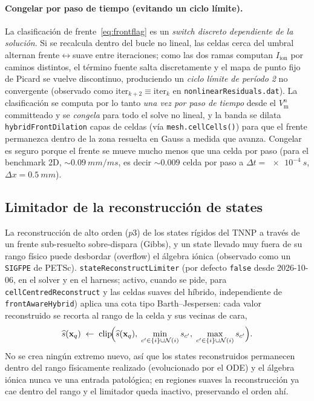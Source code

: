 \documentclass[11pt,a4paper]{article}
\newcommand{\code}[1]{\texttt{\small #1}}
\newcommand{\Vm}{V_{\text{m}}}
\newcommand{\Iion}{I_{\mathrm{ion}}}
\newcommand{\dictkey}[1]{\textcolor{black!60!green}{\texttt{\footnotesize #1}}}
\begin{document}
\paragraph{Congelar por paso de tiempo (evitando un ciclo límite).}
La clasificación de frente~\eqref{eq:frontflag} es un \emph{switch discreto
dependiente de la solución}. Si se recalcula dentro del bucle no lineal, las celdas
cerca del umbral alternan frente$\leftrightarrow$suave entre iteraciones; como las
dos ramas computan $\Iion$ por caminos distintos, el término fuente salta
discretamente y el mapa de punto fijo de Picard se vuelve discontinuo, produciendo
un \emph{ciclo límite de período 2} no convergente (observado como
$\text{iter}_{k+2}\equiv\text{iter}_k$ en \code{nonlinearResiduals.dat}). La
clasificación se computa por lo tanto \emph{una vez por paso de tiempo} desde el
$\Vm^{n}$ committeado y se \emph{congela} para todo el solve no lineal, y la banda
se dilata \dictkey{hybridFrontDilation} capas de celdas (vía
\code{mesh.cellCells()}) para que el frente permanezca dentro de la zona resuelta
en Gauss a medida que avanza. Congelar es seguro porque el frente se mueve mucho
menos que una celda por paso (para el benchmark 2D, $\sim\!\SI{0.09}{mm/ms}$, es
decir $\sim\!0.009$ celda por paso a $\Delta t=\SI{e-4}{s}$, $\Delta x=\SI{0.5}{mm}$).

\subsection{Limitador de la reconstrucción de states}
\label{sec:limiter}

La reconstrucción de alto orden ($p3$) de los states rígidos del TNNP a través de
un frente sub-resuelto sobre-dispara (Gibbs), y un state llevado muy fuera de su
rango físico puede desbordar (overflow) el álgebra iónica (observado como un
\code{SIGFPE} de PETSc). \dictkey{stateReconstructLimiter} (por defecto
\code{false} desde 2026-10-06, en el solver y en el harness; activo, cuando se
pide, para \code{cellCentredReconstruct} y las celdas suaves del híbrido,
independiente de \dictkey{frontAwareHybrid}) aplica una cota tipo
Barth--Jespersen: cada valor reconstruido se recorta al rango de la celda y sus
vecinas de cara,
\begin{equation}
  \widehat{s}(\mathbf{x}_q)
  \;\leftarrow\;
  \mathrm{clip}\!\Bigl(\widehat{s}(\mathbf{x}_q),\;
     \min_{c'\in\{i\}\cup\mathcal{N}(i)} s_{c'},\;
     \max_{c'\in\{i\}\cup\mathcal{N}(i)} s_{c'}\Bigr).
  \label{eq:limiter}
\end{equation}
No se crea ningún extremo nuevo, así que los states reconstruidos permanecen dentro
del rango físicamente realizado (evolucionado por el ODE) y el álgebra iónica nunca
ve una entrada patológica; en regiones suaves la reconstrucción ya cae dentro del
rango y el limitador queda inactivo, preservando el orden ahí.
\end{document}
